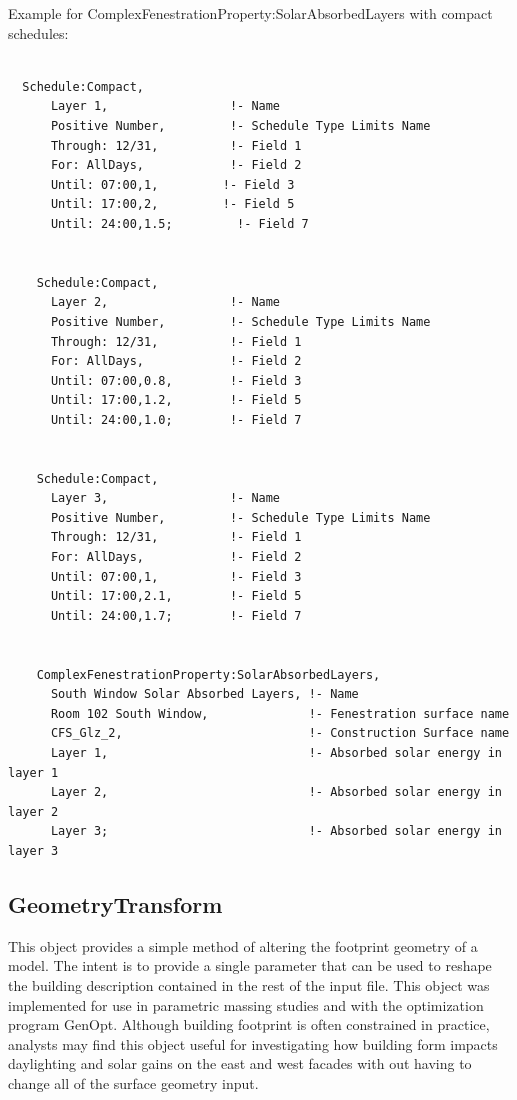 Example for ComplexFenestrationProperty:SolarAbsorbedLayers with compact schedules:

\begin{lstlisting}

  Schedule:Compact,
      Layer 1,                 !- Name
      Positive Number,         !- Schedule Type Limits Name
      Through: 12/31,          !- Field 1
      For: AllDays,            !- Field 2
      Until: 07:00,1,         !- Field 3
      Until: 17:00,2,         !- Field 5
      Until: 24:00,1.5;         !- Field 7


    Schedule:Compact,
      Layer 2,                 !- Name
      Positive Number,         !- Schedule Type Limits Name
      Through: 12/31,          !- Field 1
      For: AllDays,            !- Field 2
      Until: 07:00,0.8,        !- Field 3
      Until: 17:00,1.2,        !- Field 5
      Until: 24:00,1.0;        !- Field 7


    Schedule:Compact,
      Layer 3,                 !- Name
      Positive Number,         !- Schedule Type Limits Name
      Through: 12/31,          !- Field 1
      For: AllDays,            !- Field 2
      Until: 07:00,1,          !- Field 3
      Until: 17:00,2.1,        !- Field 5
      Until: 24:00,1.7;        !- Field 7


    ComplexFenestrationProperty:SolarAbsorbedLayers,
      South Window Solar Absorbed Layers, !- Name
      Room 102 South Window,              !- Fenestration surface name
      CFS_Glz_2,                          !- Construction Surface name
      Layer 1,                            !- Absorbed solar energy in layer 1
      Layer 2,                            !- Absorbed solar energy in layer 2
      Layer 3;                            !- Absorbed solar energy in layer 3
\end{lstlisting}

\subsection{GeometryTransform}\label{geometrytransform}

This object provides a simple method of altering the footprint geometry of a model. The intent is to provide a single parameter that can be used to reshape the building description contained in the rest of the input file. This object was implemented for use in parametric massing studies and with the optimization program GenOpt. Although building footprint is often constrained in practice, analysts may find this object useful for investigating how building form impacts daylighting and solar gains on the east and west facades with out having to change all of the surface geometry input.

